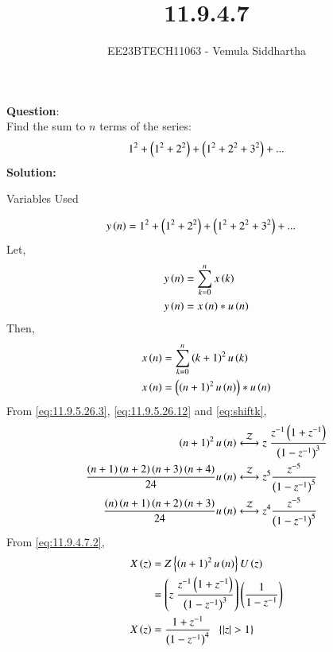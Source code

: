 \documentclass[journal,12pt,twocolumn]{IEEEtran}
\theoremstyle{remark}
\begin{document}

\vspace{3cm}

\title{11.9.4.7}
\author{EE23BTECH11063 - Vemula Siddhartha
}
\maketitle
\newpage
\bigskip

\renewcommand{\thefigure}{\theenumi}
\renewcommand{\thetable}{\theenumi}
\textbf{Question}:\\
Find the sum to $n$ terms of the series:
\begin{align*}
    1^2+\left(1^2+2^2\right)+\left(1^2+2^2+3^2\right)+...
\end{align*}
\textbf{Solution:}
\begin{table}[h!]    
    \centering
    
    \caption{Variables Used}
    \label{tab10.5.3.9.1}
  \end{table}
\begin{align}
    y\left(n\right)&=1^2+\left(1^2+2^2\right)+\left(1^2+2^2+3^2\right)+...
\end{align}
Let,
\begin{align}
    y\left(n\right)&=\sum_{k=0}^{n}x\left(k\right)\\
    y\left(n\right)&=x\left(n\right)*u\left(n\right)\label{eq:11.9.4.7.1}
\end{align}
Then,
\begin{align}
    x\left(n\right)&=\sum_{k=0}^{n}\left(k+1\right)^2u\left(k\right)\\
    x\left(n\right)&=\left(\left(n+1\right)^2u\left(n\right)\right)*u\left(n\right)
\end{align}
From \eqref{eq:11.9.5.26.3}, \eqref{eq:11.9.5.26.12} and \eqref{eq:shiftk},
\begin{align}
    \brak{n+1}^2u\brak{n}&\system{Z}z\;\frac{z^{-1}\brak{1+z^{-1}}}{\brak{1-z^{-1}}^3}\label{eq:11.9.4.7.2}\\
    \frac{\brak{n+1}\brak{n+2}\brak{n+3}\brak{n+4}}{24}u\brak{n}&\system{Z}z^5\frac{z^{-5}}{\brak{1-z^{-1}}^5}\label{eq:11.9.4.7.3}\\
    \frac{\brak{n}\brak{n+1}\brak{n+2}\brak{n+3}}{24}u\brak{n}&\system{Z}z^4\frac{z^{-5}}{\brak{1-z^{-1}}^5}\label{eq:11.9.4.7.4}
\end{align}
From \eqref{eq:11.9.4.7.2},
\begin{align}
    X\left(z\right)&=Z\left\{\left(n+1\right)^2u\left(n\right)\right\}U\left(z\right)\\
    &=\left(z\;\frac{z^{-1}\left(1+z^{-1}\right)}{\left(1-z^{-1}\right)^3}\right)\left(\frac{1}{1-z^{-1}}\right)\\
    X\left(z\right)&=\frac{1+z^{-1}}{\left(1-z^{-1}\right)^4}\;\;\left\{\left\vert z\right\vert>1\right\}
\end{align}
\end{document}
